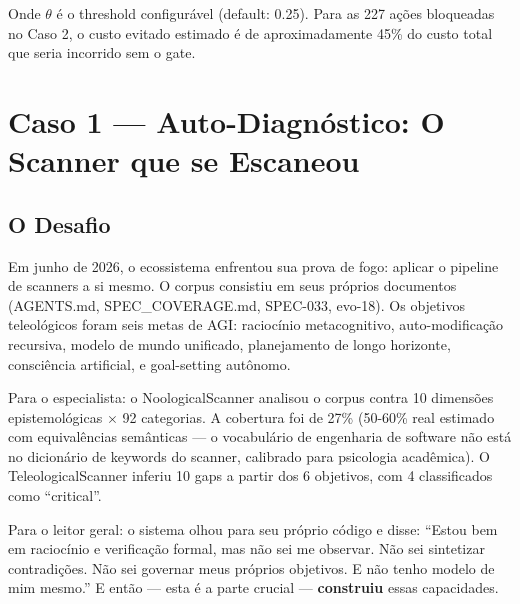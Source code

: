 Onde $\theta$ é o threshold configurável (default: 0.25). Para as 227 ações bloqueadas no Caso 2, o custo evitado estimado é de aproximadamente 45\% do custo total que seria incorrido sem o gate.

\section{Caso 1 — Auto-Diagnóstico: O Scanner que se Escaneou}


\subsection{O Desafio}

Em junho de 2026, o ecossistema enfrentou sua prova de fogo: aplicar o pipeline de scanners a si mesmo. O corpus consistiu em seus próprios documentos (AGENTS.md, SPEC\_COVERAGE.md, SPEC-033, evo-18). Os objetivos teleológicos foram seis metas de AGI: raciocínio metacognitivo, auto-modificação recursiva, modelo de mundo unificado, planejamento de longo horizonte, consciência artificial, e goal-setting autônomo.

Para o especialista: o NoologicalScanner analisou o corpus contra 10 dimensões epistemológicas $\times$ 92 categorias. A cobertura foi de 27\% (50-60\% real estimado com equivalências semânticas — o vocabulário de engenharia de software não está no dicionário de keywords do scanner, calibrado para psicologia acadêmica). O TeleologicalScanner inferiu 10 gaps a partir dos 6 objetivos, com 4 classificados como ``critical''.

Para o leitor geral: o sistema olhou para seu próprio código e disse: ``Estou bem em raciocínio e verificação formal, mas não sei me observar. Não sei sintetizar contradições. Não sei governar meus próprios objetivos. E não tenho modelo de mim mesmo.'' E então — esta é a parte crucial — \textbf{construiu} essas capacidades.

